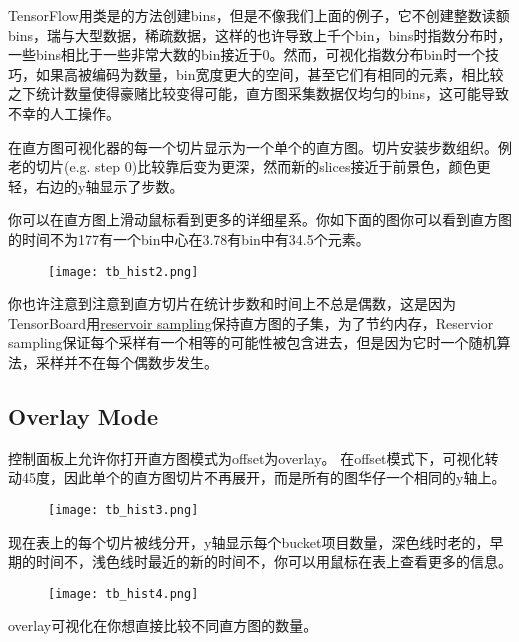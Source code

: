   TensorFlow用类是的方法创建bins，但是不像我们上面的例子，它不创建整数读额bins，瑞与大型数据，稀疏数据，这样的也许导致上千个bin，bins时指数分布时，一些bins相比于一些非常大数的bin接近于0。然而，可视化指数分布bin时一个技巧，如果高被编码为数量，bin宽度更大的空间，甚至它们有相同的元素，相比较之下统计数量使得豪赌比较变得可能，直方图采集数据仅均匀的bins，这可能导致不幸的人工操作。

在直方图可视化器的每一个切片显示为一个单个的直方图。切片安装步数组织。例老的切片(e.g. step 0)比较靠后变为更深，然而新的slices接近于前景色，颜色更轻，右边的y轴显示了步数。

你可以在直方图上滑动鼠标看到更多的详细星系。你如下面的图你可以看到直方图的时间不为177有一个bin中心在3.78有bin中有34.5个元素。
\begin{center}
\begin{figure}[H]
\texttt{[image: tb\_hist2.png]}
\end{figure}
\end{center}
你也许注意到注意到直方切片在统计步数和时间上不总是偶数，这是因为TensorBoard用\href{https://en.wikipedia.org/wiki/Reservoir\_sampling}{reservoir sampling}保持直方图的子集，为了节约内存，Reservior sampling保证每个采样有一个相等的可能性被包含进去，但是因为它时一个随机算法，采样并不在每个偶数步发生。
\subsection{Overlay Mode}
控制面板上允许你打开直方图模式为offset为overlay。
在offset模式下，可视化转动45度，因此单个的直方图切片不再展开，而是所有的图华仔一个相同的y轴上。
\begin{center}
\begin{figure}[H]
\texttt{[image: tb\_hist3.png]}
\end{figure}
\end{center}
现在表上的每个切片被线分开，y轴显示每个bucket项目数量，深色线时老的，早期的时间不，浅色线时最近的新的时间不，你可以用鼠标在表上查看更多的信息。
\begin{center}
\begin{figure}[H]
\texttt{[image: tb\_hist4.png]}
\end{figure}
\end{center}

overlay可视化在你想直接比较不同直方图的数量。
